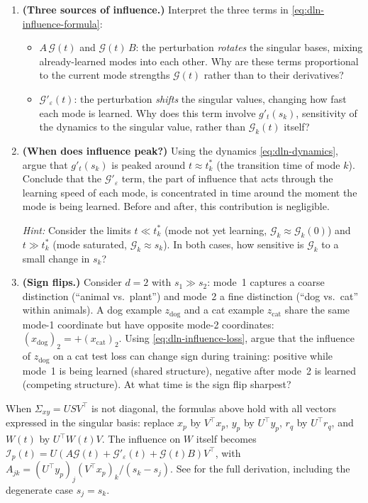 \documentclass[11pt]{article}
\begin{document}
\begin{exercise}
\begin{enumerate}
  \item[(a)] \textbf{(Three sources of influence.)} Interpret the three terms in \eqref{eq:dln-influence-formula}:
  \begin{itemize}
    \item $A\,\mathcal{G}(t)$ and $\mathcal{G}(t)\,B$: the perturbation \emph{rotates} the singular bases, mixing already-learned modes into each other. Why are these terms proportional to the current mode strengths $\mathcal{G}(t)$ rather than to their derivatives?
    \item $\mathcal{G}'_\varepsilon(t)$: the perturbation \emph{shifts} the singular values, changing how fast each mode is learned. Why does this term involve $g'_t(s_k)$, sensitivity of the dynamics to the singular value, rather than $\mathcal{G}_k(t)$ itself?
  \end{itemize}
  \item[(b)] \textbf{(When does influence peak?)} Using the dynamics \eqref{eq:dln-dynamics}, argue that $g'_t(s_k)$ is peaked around $t \approx t_k^*$ (the transition time of mode $k$). Conclude that the $\mathcal{G}'_\varepsilon$ term, the part of influence that acts through the learning speed of each mode, is concentrated in time around the moment the mode is being learned. Before and after, this contribution is negligible.

  \emph{Hint:} Consider the limits $t \ll t_k^*$ (mode not yet learning, $\mathcal{G}_k \approx \mathcal{G}_k(0)$) and $t \gg t_k^*$ (mode saturated, $\mathcal{G}_k \approx s_k$). In both cases, how sensitive is $\mathcal{G}_k$ to a small change in $s_k$?
  \item[(c)] \textbf{(Sign flips.)} Consider $d = 2$ with $s_1 \gg s_2$: mode~1 captures a coarse distinction (``animal vs.\ plant'') and mode~2 a fine distinction (``dog vs.\ cat'' within animals). A dog example $z_{\mathrm{dog}}$ and a cat example $z_{\mathrm{cat}}$ share the same mode-1 coordinate but have opposite mode-2 coordinates: $(x_{\mathrm{dog}})_2 = +(x_{\mathrm{cat}})_2$. Using \eqref{eq:dln-influence-loss}, argue that the influence of $z_{\mathrm{dog}}$ on a cat test loss can change sign during training: positive while mode~1 is being learned (shared structure), negative after mode~2 is learned (competing structure). At what time is the sign flip sharpest?
\end{enumerate}
\end{exercise}

\begin{remark}\label{rem:dln-general}
When $\Sigma_{xy} = USV^\top$ is not diagonal, the formulas above hold with all vectors expressed in the singular basis: replace $x_p$ by $V^\top x_p$, $y_p$ by $U^\top y_p$, $r_q$ by $U^\top r_q$, and $W(t)$ by $U^\top W(t) V$. The influence on $W$ itself becomes $\mathcal{I}_p(t) = U(A\mathcal{G}(t) + \mathcal{G}'_\varepsilon(t) + \mathcal{G}(t)B)V^\top$, with $A_{jk} = (U^\top y_p)_j(V^\top x_p)_k/(s_k - s_j)$. See \citet{lee2025stagewise} for the full derivation, including the degenerate case $s_j = s_k$.
\end{remark}
\end{document}
